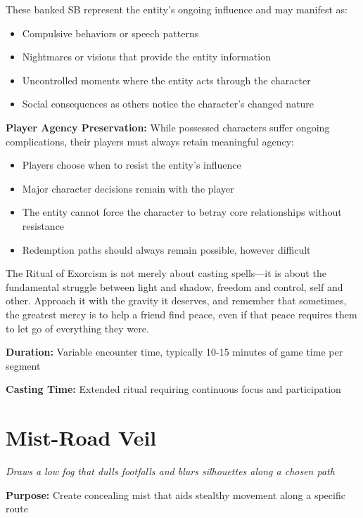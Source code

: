 These banked SB represent the entity's ongoing influence and may manifest as:
\begin{itemize}
\item Compulsive behaviors or speech patterns
\item Nightmares or visions that provide the entity information
\item Uncontrolled moments where the entity acts through the character
\item Social consequences as others notice the character's changed nature
\end{itemize}


\textbf{Player Agency Preservation:}
While possessed characters suffer ongoing complications, their players must always retain meaningful agency:
\begin{itemize}
\item Players choose when to resist the entity's influence
\item Major character decisions remain with the player
\item The entity cannot force the character to betray core relationships without resistance
\item Redemption paths should always remain possible, however difficult
\end{itemize}

The Ritual of Exorcism is not merely about casting spells—it is about the fundamental struggle between light and shadow, freedom and control, self and other. Approach it with the gravity it deserves, and remember that sometimes, the greatest mercy is to help a friend find peace, even if that peace requires them to let go of everything they were.

\textbf{Duration:} Variable encounter time, typically 10-15 minutes of game time per segment

\textbf{Casting Time:} Extended ritual requiring continuous focus and participation

\section*{Mist-Road Veil}
\textit{Draws a low fog that dulls footfalls and blurs silhouettes along a chosen path}

\textbf{Purpose:} Create concealing mist that aids stealthy movement along a specific route

